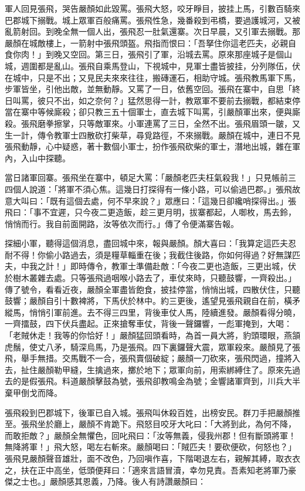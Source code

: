 軍人回見張飛，哭告嚴顏如此毀罵。張飛大怒，咬牙睜目，披挂上馬，引數百騎來巴郡城下搦戰。城上眾軍百般痛罵。張飛性急，幾番殺到弔橋，要過護城河，又被亂箭射回。到晚全無一個人出，張飛忍一肚氣還寨。次日早晨，又引軍去搦戰。那嚴顏在城敵樓上，一箭射中張飛頭盔。飛指而恨曰：「吾拏住你這老匹夫，必親自食你肉！」到晚又空回。第三日，張飛引了軍，沿城去罵。原來那座城子是個山城，週圍都是亂山。張飛自乘馬登山，下視城中，見軍士盡皆披挂，分列隊伍，伏在城中，只是不出；又見民夫來來往往，搬磚運石，相助守城。張飛教馬軍下馬，步軍皆坐，引他出敵，並無動靜。又罵了一日，依舊空回。張飛在寨中，自思「終日叫罵，彼只不出，如之奈何？」猛然思得一計，教眾軍不要前去搦戰，都結束停當在寨中等候廝殺；卻只教三五十個軍士，直去城下叫罵，引嚴顏軍出來，便與廝殺。張飛磨拳擦掌，只等敵軍來。小軍連罵了三日，全然不出。張飛眉頭一皺，又生一計，傳令教軍士四散砍打柴草，尋覓路徑，不來搦戰。嚴顏在城中，連日不見張飛動靜，心中疑惑，著十數個小軍士，扮作張飛砍柴的軍士，潛地出城，雜在軍內，入山中探聽。

當日諸軍回寨。張飛坐在寨中，頓足大罵：「嚴顏老匹夫枉氣殺我！」只見帳前三四個人說道：「將軍不須心焦。這幾日打探得有一條小路，可以偷過巴郡。」張飛故意大叫曰：「既有這個去處，何不早來說？」眾應曰：「這幾日卻纔哨探得出。」張飛曰：「事不宜遲，只今夜二更造飯，趁三更月明，拔寨都起，人啣枚，馬去鈴，悄悄而行。我自前面開路，汝等依次而行。」傳了令便滿寨告報。

探細小軍，聽得這個消息，盡回城中來，報與嚴顏。顏大喜曰：「我算定這匹夫忍耐不得！你偷小路過去，須是糧草輜重在後；我截住後路，你如何得過？好無謀匹夫，中我之計！」即時傳令，教軍士準備赴敵：「今夜二更也造飯，三更出城，伏於樹木叢雜去處。只等張飛過咽喉小路去了，車仗來時，只聽鼓響，一齊殺出。」傳了號令，看看近夜，嚴顏全軍盡皆飽食，披挂停當，悄悄出城，四散伏住，只聽鼓響；嚴顏自引十數裨將，下馬伏於林中。約三更後，遙望見張飛親自在前，橫矛縱馬，悄悄引軍前進。去不得三四里，背後車仗人馬，陸續進發。嚴顏看得分曉，一齊擂鼓，四下伏兵盡起。正來搶奪車仗，背後一聲鑼響，一彪軍掩到，大喝：「老賊休走！我等的你恰好！」嚴顏猛回頭看時，為首一員大將，豹頭環眼，燕頷虎鬚，使丈八矛，騎深烏馬，乃是張飛。四下裏鑼聲大震，眾軍殺來。嚴顏見了張飛，舉手無措。交馬戰不一合，張飛賣個破綻；嚴顏一刀砍來，張飛閃過，撞將入去，扯住嚴顏勒甲縫，生擒過來，擲於地下；眾軍向前，用索綁縛住了。原來先過去的是假張飛。料道嚴顏擊鼓為號，張飛卻教鳴金為號；金響諸軍齊到，川兵大半棄甲倒戈而降。

張飛殺到巴郡城下，後軍已自入城。張飛叫休殺百姓，出榜安民。群刀手把嚴顏推至。張飛坐於廳上，嚴顏不肯跪下。飛怒目咬牙大叱曰：「大將到此，為何不降，而敢拒敵？」嚴顏全無懼色，回叱飛曰：「汝等無義，侵我州郡！但有斷頭將軍！無降將軍！」飛大怒，喝左右斬來。嚴顏喝曰：「賊匹夫！要砍便砍，何怒也？」張飛見嚴顏聲音雄壯，面不改色，乃回嗔作喜，下階喝退左右，親解其縛，取衣衣之，扶在正中高坐，低頭便拜曰：「適來言語冒瀆，幸勿見責。吾素知老將軍乃豪傑之士也。」嚴顏感其恩義，乃降。後人有詩讚嚴顏曰：

